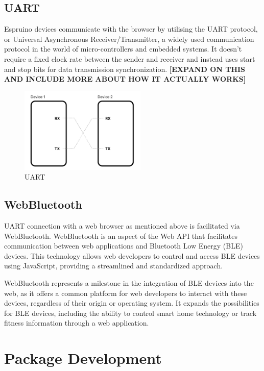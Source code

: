 \documentclass{l4proj}
\begin{document}
    
\subsection{UART}
\text Espruino devices communicate with the browser by utilising the UART protocol, or Universal Asynchronous Receiver/Transmitter, a widely used communication protocol in the world of micro-controllers and embedded systems. It doesn't require a fixed clock rate between the sender and receiver and instead uses start and stop bits for data transmission synchronization. \textbf{[EXPAND ON THIS AND INCLUDE MORE ABOUT HOW IT ACTUALLY WORKS]}


\begin{figure}[!ht]
\begin{center}
    \includegraphics[width=60mm,scale=0.5]{dissertation/images/UART_diagram.png}
\end{center}
\caption{UART}
    \label{fig:UART}
\end{figure}




\subsection{WebBluetooth}
\text UART connection with a web browser as mentioned above is facilitated via WebBluetooth. WebBluetooth is an aspect of the Web API that facilitates communication between web applications and Bluetooth Low Energy (BLE) devices. This technology allows web developers to control and access BLE devices using JavaScript, providing a streamlined and standardized approach.

WebBluetooth represents a milestone in the integration of BLE devices into the web, as it offers a common platform for web developers to interact with these devices, regardless of their origin or operating system. It expands the possibilities for BLE devices, including the ability to control smart home technology or track fitness information through a web application.

\section{Package Development}
\end{document}
